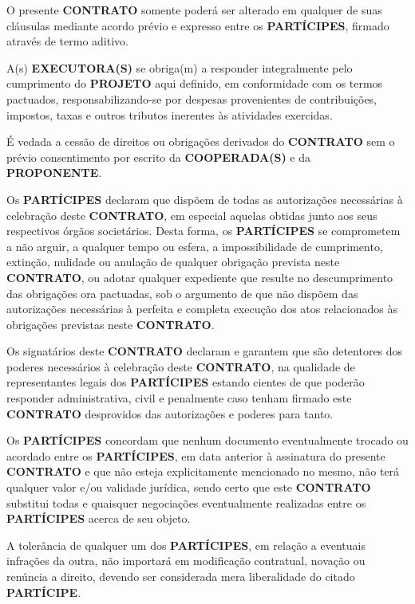 

\xx O presente \textbf{CONTRATO} somente poderá ser alterado em qualquer de suas cláusulas mediante acordo prévio e expresso entre os \textbf{PARTÍCIPES}, firmado através de termo aditivo.

\xx A(s) \textbf{EXECUTORA(S)} se obriga(m) a responder integralmente pelo cumprimento do \textbf{PROJETO} aqui definido, em conformidade com os termos pactuados, responsabilizando-se por despesas provenientes de contribuições, impostos, taxas e outros tributos inerentes às atividades exercidas.

\xx É vedada a cessão de direitos ou obrigações derivados do \textbf{CONTRATO} sem o prévio consentimento por escrito da \textbf{COOPERADA(S)} e da \textbf{PROPONENTE}.

\xx Os \textbf{PARTÍCIPES} declaram que dispõem de todas as autorizações necessárias à celebração deste \textbf{CONTRATO}, em especial aquelas obtidas junto aos seus respectivos órgãos societários. Desta forma, os \textbf{PARTÍCIPES} se comprometem a não arguir, a qualquer tempo ou esfera, a impossibilidade de cumprimento, extinção, nulidade ou anulação de qualquer obrigação prevista neste \textbf{CONTRATO}, ou adotar qualquer expediente que resulte no descumprimento das obrigações ora pactuadas, sob o argumento de que não dispõem das autorizações necessárias à perfeita e completa execução dos atos relacionados às obrigações previstas neste \textbf{CONTRATO}.

\xx Os signatários deste \textbf{CONTRATO} declaram e garantem que são detentores dos poderes necessários à celebração deste \textbf{CONTRATO}, na qualidade de representantes legais dos \textbf{PARTÍCIPES} estando cientes de que poderão responder administrativa, civil e penalmente caso tenham firmado este \textbf{CONTRATO} desprovidos das autorizações e poderes para tanto.

\xx Os \textbf{PARTÍCIPES} concordam que nenhum documento eventualmente trocado ou acordado entre os \textbf{PARTÍCIPES}, em data anterior à assinatura do presente \textbf{CONTRATO} e que não esteja explicitamente mencionado no mesmo, não terá qualquer valor e/ou validade jurídica, sendo certo que este \textbf{CONTRATO} substitui todas e quaisquer negociações eventualmente realizadas entre os \textbf{PARTÍCIPES} acerca de seu objeto.

\xx A tolerância de qualquer um dos \textbf{PARTÍCIPES}, em relação a eventuais infrações da outra, não importará em modificação contratual, novação ou renúncia a direito, devendo ser considerada mera liberalidade do citado \textbf{PARTÍCIPE}.

